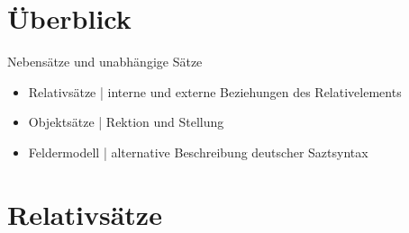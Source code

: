 \section{Überblick}

\begin{frame}
  {Nebensätze und unabhängige Sätze}
  \begin{itemize}[<+->]
    \item \alert{Relativsätze} | interne und externe Beziehungen des Relativelements
    \item \alert{Objektsätze} | Rektion und Stellung
    \Zeile
    \item \alert{Feldermodell} | alternative Beschreibung deutscher Saztsyntax
  \end{itemize}
\end{frame}


\section{Relativsätze}

